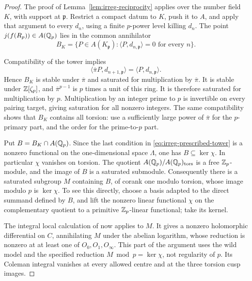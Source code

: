 \begin{proof}
The proof of Lemma~\ref{lem:irreg-reciprocity} applies over the
number field \(K\), with support at \(\mathfrak p\). Restrict a
compact datum to \(K\), push it to \(A\), and apply that argument
to every \(d_n\), using a finite \(p\)-power level killing \(d_n\).
The point \(j(f(R_p))\in A(\mathbb Q_p)\) lies in the common annihilator
\[
 B_K=\{P\in A(K_{\mathfrak p}):
             \langle P,d_{n,\mathfrak p}\rangle=0
             \text{ for every }n\}.
\]

Compatibility of the tower implies
\[
 \langle\overline\pi P,d_{n+1,\mathfrak p}\rangle
       =\langle P,d_{n,\mathfrak p}\rangle.
\]
Hence \(B_K\) is stable under \(\overline\pi\) and saturated for
multiplication by \(\overline\pi\). It is stable under
\(\mathbb Z[\zeta_p]\), and \(\overline\pi^{p-1}\) is \(p\) times a unit
of this ring. It is therefore saturated for multiplication by
\(p\). Multiplication by an integer prime to \(p\) is invertible
on every pairing target, giving saturation for all nonzero
integers. The same compatibility shows that \(B_K\) contains
all torsion: use a sufficiently large power of \(\overline\pi\)
for the \(p\)-primary part, and the order for the prime-to-\(p\) part.

Put \(B=B_K\cap A(\mathbb Q_p)\). Since the last condition in
\eqref{eq:irreg-prescribed-tower} is a nonzero functional on the
one-dimensional space \(\Lambda\), one has \(B\subseteq\ker\chi\).
In particular \(\chi\) vanishes on torsion.
The quotient \(A(\mathbb Q_p)/A(\mathbb Q_p)_{\operatorname{tors}}\) is a free
\(\mathbb Z_p\)-module, and the image of \(B\) is a saturated submodule.
Consequently there is a saturated subgroup \(M\) containing \(B\),
of corank one modulo torsion, whose image modulo \(p\) is
\(\ker\chi\). To see this directly, choose a basis adapted to the
direct summand defined by \(B\), and lift the nonzero linear
functional \(\chi\) on the complementary quotient to a primitive
\(\mathbb Z_p\)-linear functional; take its kernel.

The integral local calculation of
\cite[Section 4, Propositions 6--7 and Theorem 4,
 pp.~577--580]{McCallum1994}
now applies to \(M\). It gives a nonzero holomorphic differential
on \(C\), annihilating \(M\) under the abelian logarithm, whose
reduction is nonzero at at least one of \(O_0,O_1,O_\infty\).
This part of the argument uses the wild model and the specified
reduction \(M\bmod p=\ker\chi\), not regularity of \(p\).
Its Coleman integral vanishes at every allowed centre and at the
three torsion cusp images.


\end{proof}
